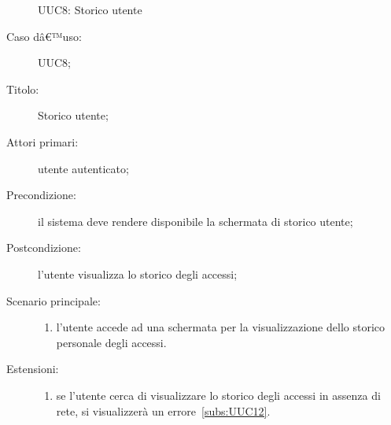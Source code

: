 \documentclass[../../../analisi-dei-requisiti.tex]{subfiles}
\begin{document}
\begin{figure}[H]
  \centering
  \caption{UUC8: Storico utente}%
  \label{fig:uuc8}
\end{figure}

\begin{description}
  \item[Caso dâ€™uso:] UUC8;
  \item[Titolo:] Storico utente;
  \item[Attori primari:] utente autenticato;
  \item[Precondizione:]  il sistema deve rendere disponibile la schermata di storico utente;
  \item[Postcondizione:] l'utente visualizza lo storico degli accessi;
  \item[Scenario principale:]
        \begin{enumerate}
          \item l'utente accede ad una schermata per la visualizzazione dello storico personale degli accessi.
        \end{enumerate}
  \item[Estensioni:]
        \begin{enumerate}
          \item se l'utente cerca di visualizzare lo storico degli accessi in assenza di rete, si visualizzerà un errore~\ref{subs:UUC12}.
        \end{enumerate}
\end{description}
\end{document}
